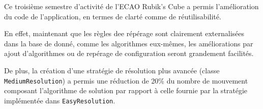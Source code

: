 Ce troisième semestre d'activité de l'ECAO Rubik's Cube a permis l'amélioration du code de l'application, en termes de clarté comme de réutilisabilité.

En effet, maintenant que les règles dee répérage sont clairement externalisées dans la base de donné, comme les algorithmes eux-mêmes, les améliorations par ajout d'algorithmes ou de repérage de configuration seront grandement facilités.

De plus, la création d'une stratégie de résolution plus avancée (classe \texttt{MediumResolution}) a permis une réduction de 20\% du nombre de mouvement composant l'algorithme de solution par rapport à celle fournie par la stratégie implémentée dans \texttt{EasyResolution}.